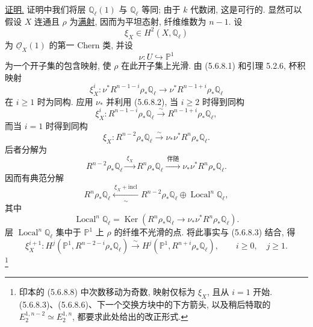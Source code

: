 \underline{证明.}
证明中我们将层 $\mathbb Q_\ell(1)$ 与 $\mathbb Q_\ell$ 等同; 由于 $k$ 代数闭, 这是可行的. 显然可以假设 $X$ 连通且 $\rho$ 为\underline{满射}, 因而为平坦态射, 纤维维数为 $n-1$. 设
\[
\xi_X\in H^2(X,\mathbb Q_\ell)
\]
为 $\underline{\mathcal O}_X(1)$ 的第一 Chern 类, 并设
\[
\nu:U\hookrightarrow\mathbb P^1
\]
为一个开子集的包含映射, 使 $\rho$ 在此开子集上光滑. 由 (5.6.8.1) 和引理 5.2.6, 杯积映射
\[
\xi_X^i:
\nu^*R^{n-1-i}\rho_*\mathbb Q_\ell
\longrightarrow
\nu^*R^{n-1+i}\rho_*\mathbb Q_\ell
\]
在 $i\geq1$ 时为同构. 应用 $\nu_*$ 并利用 (5.6.8.2), 当 $i\geq2$ 时得到同构
\begin{equation}\tag{5.6.8.3}
\xi_X^i:R^{n-1-i}\rho_*\mathbb Q_\ell
\overset{\sim}{\longrightarrow}
R^{n-1+i}\rho_*\mathbb Q_\ell,
\end{equation}
而当 $i=1$ 时得到同构
\begin{equation}\tag{5.6.8.4}
\xi_X:R^{n-2}\rho_*\mathbb Q_\ell
\overset{\sim}{\longrightarrow}
\nu_*\nu^*R^n\rho_*\mathbb Q_\ell.
\end{equation}
后者分解为
\begin{equation}\tag{5.6.8.5}
R^{n-2}\rho_*\mathbb Q_\ell
\xrightarrow{\ \xi_X\ }
R^n\rho_*\mathbb Q_\ell
\xrightarrow{\ \text{伴随}\ }
\nu_*\nu^*R^n\rho_*\mathbb Q_\ell.
\end{equation}
因而有典范分解
\begin{equation}\tag{5.6.8.6}
R^n\rho_*\mathbb Q_\ell
\xleftarrow[\sim]{\ \xi_X+\mathrm{incl}\ }
R^{n-2}\rho_*\mathbb Q_\ell\oplus
\operatorname{Local}^n\mathbb Q_\ell,
\end{equation}
其中
\begin{equation}\tag{5.6.8.7}
\operatorname{Local}^n\mathbb Q_\ell
=\operatorname{Ker}\!\left(
R^n\rho_*\mathbb Q_\ell
\longrightarrow\nu_*\nu^*R^n\rho_*\mathbb Q_\ell
\right).
\end{equation}
层 $\operatorname{Local}^n\mathbb Q_\ell$ 集中于 $\mathbb P^1$ 上 $\rho$ 的纤维不光滑的点. 将此事实与 (5.6.8.3) 结合, 得
\begin{equation}\tag{5.6.8.8}
\xi_X^{i+1}:
H^j(\mathbb P^1,R^{n-2-i}\rho_*\mathbb Q_\ell)
\overset{\sim}{\longrightarrow}
H^j(\mathbb P^1,R^{n+i}\rho_*\mathbb Q_\ell),
\qquad i\geq0,\quad j\geq1.
\end{equation}
\footnote{印本的 (5.6.8.8) 中次数移动为奇数, 映射仅标为 $\xi_X$, 且从 $i=1$ 开始. (5.6.8.3)、(5.6.8.6)、下一个交换方块中的下方箭头, 以及稍后特取的 $E_2^{1,n-2}\simeq E_2^{1,n}$, 都要求此处给出的改正形式.}

